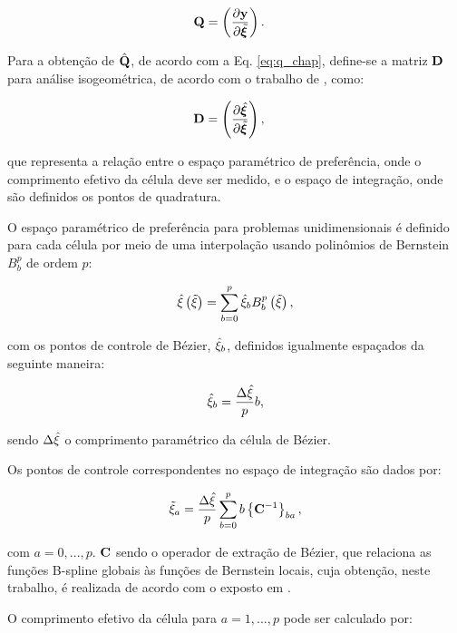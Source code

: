 \documentclass[tese_patricia]{subfiles}
\begin{document}
\begin{align}
	\mathbf{Q}&=\left(\frac{\partial\mathbf{y}}{\partial\tilde{\bm{\xi}}}\right).
\end{align}

Para a obtenção de $\hat{\mathbf{Q}}$, de acordo com a Eq. \ref{eq:q_chap}, define-se a matriz $\mathbf{D}$ para análise isogeométrica, de acordo com o trabalho de , como:

\begin{align}
	\mathbf{D}&=\left(\frac{\partial\hat{\bm{\xi}}}{\partial\tilde{\bm{\xi}}}\right),
\end{align}

\noindent que representa a relação entre o espaço paramétrico de preferência, onde o comprimento efetivo da célula deve ser medido, e o espaço de integração, onde são definidos os pontos de quadratura.

O espaço paramétrico de preferência para problemas unidimensionais é definido para cada célula por meio de uma interpolação usando polinômios de Bernstein $B_{b}^{p}$ de ordem $p$:

\begin{align}
	\hat{\xi} \left(\tilde{\xi}\right) = \sum_{b=0}^{p} \hat{\xi}_b B_{b}^{p}\left(\tilde{\xi}\right),
\end{align}

\noindent com os pontos de controle de Bézier, $\hat{\xi}_b$, definidos igualmente espaçados da seguinte maneira:

\begin{align}
	\hat{\xi}_b = \frac{\Delta{\hat{\xi}}}{p}b,
\end{align}

\noindent sendo $\Delta{\hat{\xi}}$ o comprimento paramétrico da célula de Bézier. 

Os pontos de controle correspondentes no espaço de integração são dados por:

\begin{align}
	\tilde{\xi}_a = \frac{\Delta{\hat{\xi}}}{p} \sum_{b=0}^{p}b\left\{\mathbf{C}^{-1}\right\}_{ba},
\end{align}

\noindent com $a=0,...,p$. $\mathbf{C}$  sendo o operador de extração de Bézier, que relaciona as funções B-spline globais às funções de Bernstein locais, cuja obtenção, neste trabalho, é realizada de acordo com o exposto em .

O comprimento efetivo da célula para $a = 1, ..., p$ pode ser calculado por:
\end{document}
